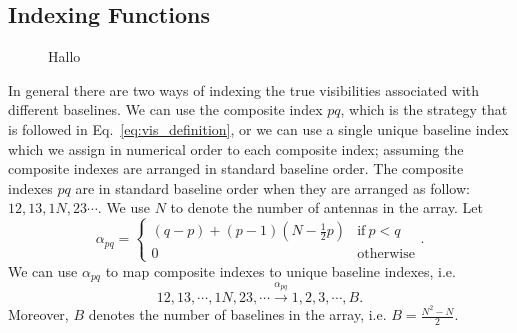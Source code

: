\documentclass[useAMS,usenatbib]{mn2e}
\begin{document}
\subsection{Indexing Functions}
\begin{figure}
\centering
{}
\caption{Hallo
\label{fig:pl}} 
\end{figure}

In general there are two ways of indexing the true visibilities associated with different baselines. We can use the composite index $pq$, which is the strategy that is followed in Eq.~\eqref{eq:vis_definition},
or we can use a single unique baseline index which we assign in numerical order to each composite index; assuming the composite indexes are arranged in standard baseline order.
The composite indexes $pq$ are in standard baseline order when they are arranged as follow: $12, 13, 1N, 23\cdots$. We use $N$ to denote the number of antennas in the array. Let 
\begin{equation}
\alpha_{pq} =
\begin{cases}
(q-p) + (p-1)\left (N-\frac{1}{2}p \right ) & \textrm{if}~p<q\\
0 & \textrm{otherwise}
\end{cases}.
\end{equation}
We can use $\alpha_{pq}$ to map composite indexes to unique baseline indexes, i.e. 
\begin{equation}
12,13,\cdots,1N,23,\cdots \xrightarrow{\alpha_{pq}} 1,2,3,\cdots,B.
\end{equation}
Moreover, $B$ denotes the number of baselines in the array, i.e. $B = \frac{N^2-N}{2}$.
\end{document}

